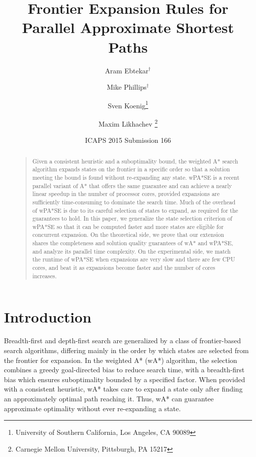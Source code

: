 \documentclass[letterpaper]{article}
\begin{document}
%
\title{Frontier Expansion Rules for Parallel Approximate Shortest Paths}
\author{Aram Ebtekar$^\dagger$ \and Mike Phillips$^\dagger$ \and Sven Koenig\thanks{University of Southern California, Los Angeles, CA 90089} \and Maxim Likhachev%
\thanks{Carnegie Mellon University, Pittsburgh, PA 15217}%
%
}
\author{ICAPS 2015 Submission 166}%
\maketitle
\begin{abstract}
\begin{quote}
Given a consistent heuristic and a suboptimality bound, the weighted A* search algorithm expands states on the frontier in a specific order so that a solution meeting the bound is found without re-expanding any state.
wPA*SE is a recent parallel variant of A* that offers the same guarantee and can achieve a nearly linear speedup in the number of processor cores, provided expansions are sufficiently time-consuming to dominate the search time.
Much of the overhead of wPA*SE is due to its careful selection of states to expand, as required for the guarantees to hold.
In this paper, we generalize the state selection criterion of wPA*SE so that it can be computed faster and more states are eligible for concurrent expansion.
On the theoretical side, we prove that our extension shares the completeness and solution quality guarantees of wA* and wPA*SE, and analyze its parallel time complexity.
On the experimental side, we match the runtime of wPA*SE when expansions are very slow and there are few CPU cores, and beat it as expansions become faster and the number of cores increases.
\end{quote}
\end{abstract}

\section{Introduction}

Breadth-first and depth-first search are generalized by a class of frontier-based search algorithms, differing mainly in the order by which states are selected from the frontier for expansion. In the weighted A* (wA*) algorithm, the selection combines a greedy goal-directed bias to reduce search time, with a breadth-first bias which ensures suboptimality bounded by a specified factor. When provided with a consistent heuristic, wA* takes care to expand a state only after finding an approximately optimal path reaching it. Thus, wA* can guarantee approximate optimality without ever re-expanding a state.
\end{document}
